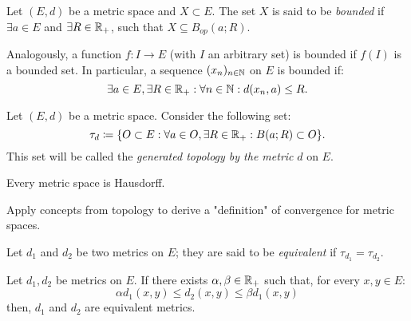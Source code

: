 \begin{definition}
	Let $(E, d)$ be a metric space and $X \subset E$. The set $X$ is said to be \emph{bounded} if $\exists a \in E$ and $\exists R \in \mathbb{R}_+$, such that $X \subseteq B_{op}(a;R)$. \par
	Analogously, a function $f : I \to E$ (with $I$ an arbitrary set) is bounded if $f(I)$ is a bounded set. In particular, a sequence $(x_n)_{n \in \mathbb{N}}$ on $E$ is bounded if:
	\begin{equation*}
		\exists a \in E, \exists R \in \mathbb{R}_+ : \forall n \in \mathbb{N} : d(x_n, a) \leq R .
	\end{equation*}
\end{definition}


\begin{definition}
	Let $(E,d)$ be a metric space. Consider the following set:
	\begin{equation*}
		\tau_d \coloneqq \{O \subset E : \forall a \in O, \exists R \in \mathbb{R}_+ : B(a;R) \subset O \}.
	\end{equation*}
	This set will be called the \emph{generated topology by the metric} $d$ on $E$.
\end{definition}

\begin{theorem}
	Every metric space is Hausdorff.	
\end{theorem}

Apply concepts from topology to derive a "definition" of convergence for metric spaces.

\begin{definition}
	Let $d_1$ and $d_2$ be two metrics on $E$; they are said to be \emph{equivalent} if $\tau_{d_1} = \tau_{d_2}$.
\end{definition}

\begin{proposition}
	Let $d_1, d_2$ be metrics on $E$.
	If there exists $\alpha, \beta \in \mathbb{R}_+$ such that, for every $x,y\in E$:
	\begin{equation*}
		\alpha d_1(x,y) \leq d_2(x,y) \leq \beta d_1(x,y)	
	\end{equation*}
	then, $d_1$ and $d_2$ are equivalent metrics.
\end{proposition}
